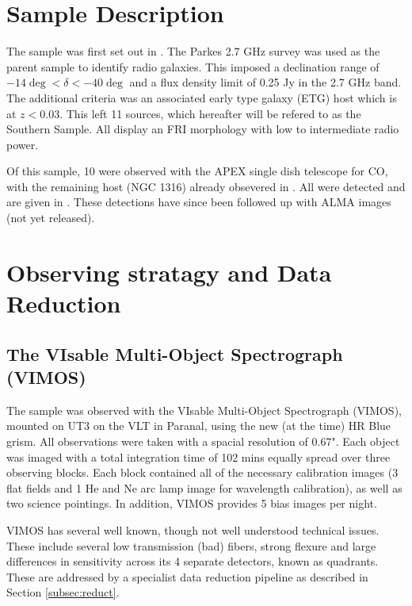 \documentclass[a4paper,fleqn,usenatbib,useAMS]{mnras}
\begin{document}

\section{Sample Description}
	\label{sec:samp}
	The sample was first set out in \citet{Prandoni2010}. The Parkes 2.7 GHz survey was used as the parent sample to identify radio galaxies. This imposed a declination range of $-14\deg < \delta < -40\deg$ and a flux density limit of 0.25 Jy in the 2.7 GHz band. The additional criteria was an associated early type galaxy (ETG) host which is at $z<0.03$. This left 11 sources, which hereafter will be refered to as the Southern Sample. All display an FRI morphology with low to intermediate radio power.

	Of this sample, 10 were observed with the APEX single dish telescope for CO, with the remaining host (NGC 1316) already obsevered in \citet{Horellou2001}. All were detected and are given in \citet{Prandoni2010}. These detections have since been followed up with ALMA images (not yet released). 


\section{Observing stratagy and Data Reduction}
	\label{sec:obs}
	\subsection{The VIsable Multi-Object Spectrograph (VIMOS)}
		\label{subsec:VIMOS}
		The sample was observed with the VIsable Multi-Object Spectrograph (VIMOS), mounted on UT3 on the VLT in Paranal, using the new (at the time) HR Blue grism. All observations were taken with a spacial resolution of 0.67". Each object was imaged with a total integration time of 102 mins equally spread over three observing blocks. Each block contained all of the necessary calibration images (3 flat fields and 1 He and Ne arc lamp image for wavelength calibration), as well as two science pointings. In addition, VIMOS provides 5 bias images per night. 

		VIMOS has several well known, though not well understood technical issues. These include several low transmission (bad) fibers, strong flexure and large differences in sensitivity across its 4 separate detectors, known as quadrants. These are addressed by a specialist data reduction pipeline as described in Section \ref{subsec:reduct}. 
\end{document}
